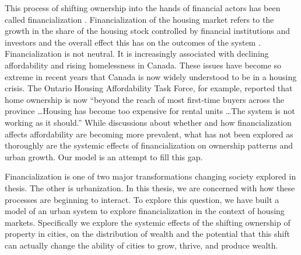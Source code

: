 


This process of shifting ownership into the hands of financial actors has been called financialization \cite{farhaReportFinancializationHousing2017, hansenFinanceCapitalismFinancialization2014, tomaskovic-deveyFinancializationCausesInequality2013, palleyFinancializationWhatIt2007, seccarecciaUnderstandingFinancializationHistory2013, nemtinFinancializationHousingSocial2021}.  
Financialization of the housing market refers to the growth in the share of the housing stock controlled by financial institutions and investors and the overall effect this has on the outcomes of the system \cite{farhaReportFinancializationHousing2017, hansenFinanceCapitalismFinancialization2014}. %
Financialization is not neutral. It is increasingly associated with declining affordability and rising homelessness in Canada. These issues have become so extreme in recent years that Canada is now widely understood to be in a housing crisis. The Ontario Housing Affordability Task Force, for example, reported that home ownership is now ``beyond the reach of most first-time buyers across the province \dots Housing has become too expensive for rental units \dots The system is not working as it should.'' While discussions about whether and how financialization affects affordability are becoming more prevalent, what has not been explored as thoroughly are the systemic effects of financialization on ownership patterns and urban growth. Our model is an attempt to fill this gap.%

Financialization is one of two major transformations changing society explored in thesis. The other is urbanization. In this thesis, we are concerned with how these processes are beginning to interact. To explore this question, we have built a model of an urban system to explore financialization in the context of housing markets. Specifically we explore the systemic effects of the shifting ownership of property in cities, on the distribution of wealth and the potential that this shift can actually change the ability of cities to grow, thrive, and produce wealth.


